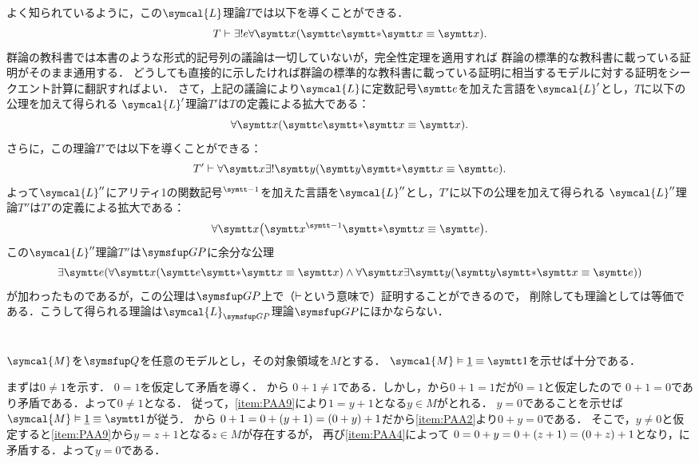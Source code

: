\subsection*{}

よく知られているように，この\(\symcal{L}\)理論\(T\)では以下を導くことができる．
\[
	T \provable \uexists e \forall \obj{x} \paren{\obj{e} \obj{\ast} \obj{x} \objeq \obj{x}}.
\]
群論の教科書では本書のような形式的記号列の議論は一切していないが，完全性定理を適用すれば
群論の標準的な教科書に載っている証明がそのまま通用する．
どうしても直接的に示したければ群論の標準的な教科書に載っている証明に相当するモデルに対する証明をシークエント計算に翻訳すればよい．
さて，上記の議論により\(\symcal{L}\)に定数記号\(\obj{e}\)を加えた言語を\(\symcal{L}'\)とし，\(T\)に以下の公理を加えて得られる
\(\symcal{L}'\)理論\(T'\)は\(T\)の定義による拡大である：
\[
	\forall \obj{x} \paren{\obj{e} \obj{\ast} \obj{x} \objeq \obj{x}}.
\]
さらに，この理論\(T'\)では以下を導くことができる：
\[
	T' \provable \forall \obj{x} \uexists \obj{y} \paren{\obj{y} \obj{\ast} \obj{x} \objeq \obj{e}}.
\]
よって\(\symcal{L}''\)にアリティ1の関数記号\({}^{\obj{-1}}\)を加えた言語を\(\symcal{L}''\)とし，\(T'\)に以下の公理を加えて得られる
\(\symcal{L}''\)理論\(T''\)は\(T'\)の定義による拡大である：
\[
	\forall \obj{x} \paren{\obj{x}^{\obj{-1}} \obj{\ast} \obj{x} \objeq \obj{e}}.
\]
この\(\symcal{L}''\)理論\(T''\)は\(\GP\)に余分な公理
\[
	\exists \obj{e} \paren{\forall \obj{x} \paren{\obj{e} \obj{\ast} \obj{x} \objeq \obj{x}} \land \forall \obj{x} \exists \obj{y} \paren{\obj{y} \obj{\ast} \obj{x} \objeq \obj{e}}}
\]
が加わったものであるが，この公理は\(\GP\)上で（\(\vdash\)という意味で）証明することができるので，
削除しても理論としては等価である．こうして得られる理論は\(\symcal{L}_{\GP}\)理論\(\GP\)にほかならない．



\section*{}

\subsection*{}

\(\symcal{M}\)を\(\Robinson\)を任意のモデルとし，その対象領域を\(M\)とする．
\(\symcal{M} \satisfy \numeral{1} \objeq \obj{1}\)を示せば十分である．

まずは\(0 \neq 1\)を示す．
\(0 = 1\)を仮定して矛盾を導く．
から
\(0 + 1 \neq 1\)である．しかし，から\(0 + 1 = 1\)だが\(0 = 1\)と仮定したので
\(0 + 1 = 0\)であり矛盾である．よって\(0 \neq 1\)となる．
従って，\cref{item:PAA9}により\(1 = y + 1\)となる\(y \in M\)がとれる．
\(y = 0\)であることを示せば\(\symcal{M} \satisfy \numeral{1} \objeq \obj{1}\)が従う．
から
\(0 + 1 = 0 + \paren{y + 1} = \paren{0 + y} + 1\)だから\cref{item:PAA2}より\(0 + y = 0\)である．
そこで，\(y \neq 0\)と仮定すると\cref{item:PAA9}から\(y = z + 1\)となる\(z \in M\)が存在するが，
再び\cref{item:PAA4}によって
\(0 = 0 + y = 0 + \paren{z + 1} = \paren{0 + z} + 1\)となり，に矛盾する．よって\(y = 0\)である．
